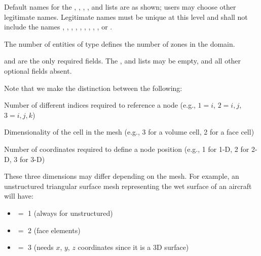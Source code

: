 \begin{notes}
\item
 Default names for the , ,
 , , and
 lists are as shown; users may choose other legitimate names.
 Legitimate names must be unique at this level and shall not
 include the names , ,
 , , ,
 , , ,
 , or .
\item
 The number of entities of type  defines the number of zones
 in the domain.
\item
  and  are the only required
 fields.
 The ,  and 
 lists may be empty, and all other optional fields absent.
\end{notes}

Note that we make the distinction between the following:

\begin{Ventryi}{}
   \item [\fort{IndexDimension}]
         Number of different indices required to
         reference a node (e.g., $1 = i$, $2 = i,j$, $3 = i,j,k$)
   \item [\fort{CellDimension}]
         Dimensionality of the cell in the mesh (e.g., 3 for a volume cell,
         2 for a face cell)
   \item [\fort{PhysicalDimension}]
         Number of coordinates required to define a node position
         (e.g., 1 for 1-D, 2 for 2-D, 3 for 3-D)
\end{Ventryi}

These three dimensions may differ depending on the mesh.
For example, an unstructured triangular surface mesh representing the
wet surface of an aircraft will have:

\begin{itemize}
   \item {} $=$ 1 (always for unstructured)
   \item {} $=$ 2  (face elements)
   \item {} $=$ 3  (needs $x$, $y$, $z$ coordinates
         since it is a 3D surface)
\end{itemize}

